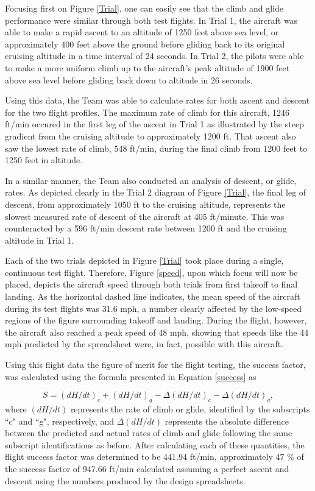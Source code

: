 \documentclass[titlepage]{article}
\begin{document}
Focusing first on Figure \ref{Trial}, one can easily see that the climb and glide performance were similar through both test flights. In Trial 1, the aircraft was able to make a rapid ascent to an altitude of 1250 feet above sea level, or approximately 400 feet above the ground before gliding back to its original cruising altitude in a time interval of 24 seconds. In Trial 2, the pilots were able to make a more uniform climb up to the aircraft's peak altitude of 1900 feet above sea level before gliding back down to altitude in 26 seconds. 

Using this data, the Team was able to calculate rates for both ascent and descent for the two flight profiles. The maximum rate of climb for this aircraft, 1246 ft/min occured in the first leg of the ascent in Trial 1 as illustrated by the steep gradient from the cruising altitude to approximately 1200 ft. That ascent also saw the lowest rate of climb, 548 ft/min, during the final climb from 1200 feet to 1250 feet in altitude.

In a similar manner, the Team also conducted an analysis of descent, or glide, rates. As depicted clearly in the Trial 2 diagram of Figure \ref{Trial}, the final leg of descent, from approximately 1050 ft to the cruising altitude, represents the slowest measured rate of descent of the aircraft at 405 ft/minute. This was counteracted by a 596 ft/min descent rate between 1200 ft and the cruising altitude in Trial 1.

Each of the two trials depicted in Figure \ref{Trial} took place during a single, continuous test flight. Therefore, Figure \ref{speed}, upon which focus will now be placed, depicts the aircraft speed through both trials from first takeoff to final landing. As the horizontal dashed line indicates, the mean speed of the aircraft during its test flights was 31.6 mph, a number clearly affected by the low-speed regions of the figure surrounding takeoff and landing. During the flight, however, the aircraft also reached a peak speed of 48 mph, showing that speeds like the 44 mph predicted by the spreadsheet were, in fact, possible with this aircraft.  

Using this flight data the figure of merit for the flight testing, the success factor, was calculated using the formula presented in Equation \ref{success} as

\begin{equation}
S = (dH/dt)_c + (dH/dt)_g - \Delta(dH/dt)_c - \Delta(dH/dt)_g,
\label{success}
\end{equation} 
where $(dH/dt)$ represents the rate of climb or glide, identified by the subscripts ``c" and ``g", respectively, and $\Delta(dH/dt)$ represents the absolute difference between the predicted and actual rates of climb and glide following the same subscript identifications as before. After calculating each of these quantities, the flight success factor was determined to be 441.94 ft/min, approximately 47 \% of the success factor of 947.66 ft/min calculated assuming a perfect ascent and descent using the numbers produced by the design spreadsheets.
\end{document}
